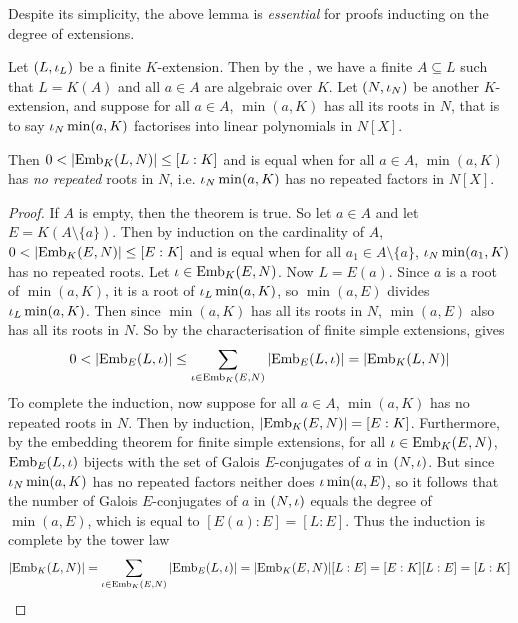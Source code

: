 \documentclass[main.tex]{subfiles}
\begin{document}
\begin{rmk}
  Despite its simplicity, the above lemma
  is \emph{essential} for proofs inducting on the degree of extensions.
\end{rmk}

\begin{thm}  
  
  Let $(L,\iota_L)$ be a finite $K$-extension.
  Then by the , 
  we have a finite $A \subseteq L$ such that 
  $L = K(A)$ and all $a \in A$ are algebraic over $K$. 
  Let $(N,\iota_N)$ be another $K$-extension, 
  and suppose for all $a \in A$, 
  $\min(a,K)$ has all its roots in $N$, 
  that is to say $\iota_N \min(a,K)$ factorises 
  into linear polynomials in $N[X]$. 

  Then $0 < |\mathrm{Emb}_{K}(L, N)| \leq [L : K]$
  and is equal when for all $a \in A$, 
  $\min(a,K)$ has \emph{no repeated} roots in $N$,
  i.e. $\iota_N \min(a,K)$ has no repeated factors in $N[X]$.  

\end{thm} 
\begin{proof}
  If $A$ is empty, then the theorem is true.
  So let $a \in A$ and let $E = K(A \setminus \{a\})$. 
  Then by induction on the cardinality of $A$, 
  $0 < |\mathrm{Emb}_{K}(E, N)| \leq [E : K]$
  and is equal when for all $a_1 \in A \setminus \{a\}$, 
  $\iota_N \min(a_1,K)$ has no repeated roots. 
  Let $\iota \in \mathrm{Emb}_{K}(E, N)$. 
  Now $L = E(a)$.
  Since $a$ is a root of $\min(a,K)$,
  it is a root of $\iota_L \min(a,K)$,
  so $\min(a,E)$ divides $\iota_L \min(a,K)$. 
  Then since $\min(a,K)$ has all its roots in $N$,
  $\min(a,E)$ also has all its roots in $N$. 
  So by the 
  {characterisation of finite simple extensions}, 
  gives \[
    0 < |\mathrm{Emb}_{E}(L, \iota)| 
    \leq \sum_{\iota \in \mathrm{Emb}_{K}(E, N)} |\mathrm{Emb}_{E}(L, \iota)| = |\mathrm{Emb}_{K}(L, N)|
  \]
  To complete the induction, 
  now suppose for all $a \in A$, $\min(a,K)$ has no repeated roots in $N$. 
  Then by induction, $|\mathrm{Emb}_{K}(E, N)| = [E : K]$. 
  Furthermore, by the 
  {embedding theorem for finite simple extensions}, 
  for all $\iota \in \mathrm{Emb}_{K}(E, N)$, 
  $\mathrm{Emb}_{E}(L, \iota)$ bijects with 
  the set of Galois $E$-conjugates of $a$ in $(N,\iota)$.
  But since $\iota_N \min(a, K)$ has no repeated factors 
  neither does $\iota \min(a,E)$, 
  so it follows that the number of Galois $E$-conjugates of $a$ in $(N,\iota)$
  equals the degree of $\min(a,E)$, which is equal to $[E(a) : E] = [L : E]$. 
  Thus the induction is complete by the tower law \[
    |\mathrm{Emb}_{K}(L, N)| = \sum_{\iota \in \mathrm{Emb}_{K}(E, N)} |\mathrm{Emb}_{E}(L, \iota)|
    = |\mathrm{Emb}_{K}(E, N)| [L : E] = [E : K] [L : E] = [L : K]
  \]
\end{proof}
\end{document}
